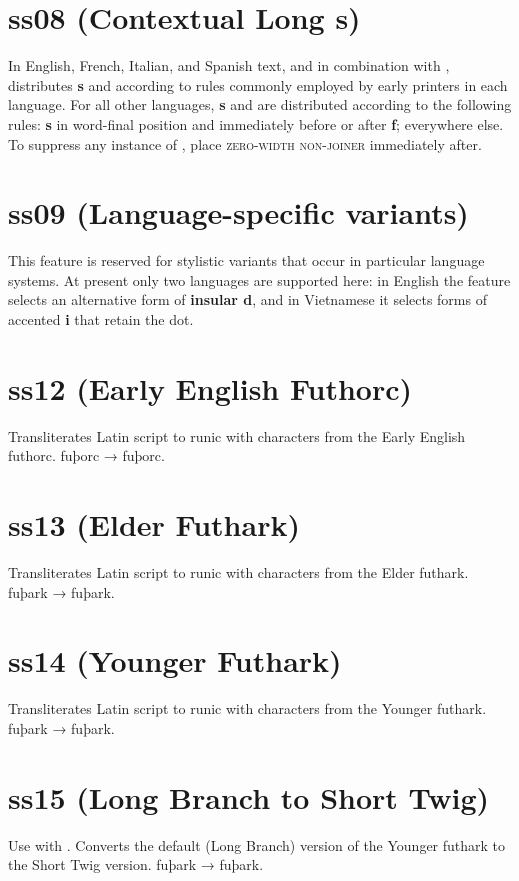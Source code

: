 \documentclass[12pt,letterpaper,openany]{book}
\begin{document}
\section{ss08 (Contextual Long s)}
In English, French, Italian, and Spanish text, and in combination with , distributes \textbf{s} and
\textbf{}
according to rules commonly employed by early printers in each language. For all other languages,
\textbf{s} and \textbf{} are distributed according to the following rules:
\textbf{s} in word-final position and immediately before or after \textbf{f};
\textbf{} everywhere else. To suppress any instance of \textbf{},
place  \textsc{zero-width non-joiner} immediately after.

\section{ss09  (Language-specific variants)}
This feature is reserved for stylistic variants that occur in particular language
systems. At present only two languages are supported here: in English the feature
selects an alternative form of \textbf{insular d}, and in Vietnamese it selects forms of
accented \textbf{i} that retain the dot.

\section{ss12 (Early English Futhorc)}
Transliterates Latin script to runic with characters from the Early English futhorc. fuþorc
→ { fuþorc}.

\section{ss13 (Elder Futhark)}
Transliterates Latin script to runic with characters from the Elder futhark. fuþark
→ { fuþark}.

\section{ss14 (Younger Futhark)}
Transliterates Latin script to runic with characters from the Younger futhark. fuþark
→ { fuþark}.

\section{ss15 (Long Branch to Short Twig)}
Use with . Converts the default (Long Branch) version of the Younger futhark
to the Short Twig version. fuþark
→ { fuþark}.
\end{document}
